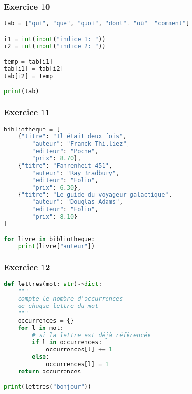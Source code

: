 \documentclass[svgnames,11pt]{beamer}
\begin{document}
\begin{frame}[fragile]
    \frametitle{Exercice 10}

\begin{exo}
\begin{lstlisting}[language=Python,basicstyle=\ttfamily\small  , xleftmargin=2em, xrightmargin=2em]
tab = ["qui", "que", "quoi", "dont", "où", "comment"]

i1 = int(input("indice 1: "))
i2 = int(input("indice 2: "))

temp = tab[i1]
tab[i1] = tab[i2]
tab[i2] = temp

print(tab)
\end{lstlisting}
\end{exo}    

\end{frame}

\begin{frame}[fragile]
    \frametitle{Exercice 11}

\begin{exo}
\begin{lstlisting}[language=Python,basicstyle=\ttfamily\small  , xleftmargin=2em, xrightmargin=2em]
bibliotheque = [
    {"titre": "Il était deux fois", 
        "auteur": "Franck Thilliez",
        "editeur": "Poche",
        "prix": 8.70},
    {"titre": "Fahrenheit 451", 
        "auteur": "Ray Bradbury",
        "editeur": "Folio",
        "prix": 6.30},
    {"titre": "Le guide du voyageur galactique", 
        "auteur": "Douglas Adams",
        "editeur": "Folio",
        "prix": 8.10}
]

for livre in bibliotheque:
    print(livre["auteur"])
\end{lstlisting}
\end{exo}    

\end{frame}
\begin{frame}[fragile]
    \frametitle{Exercice 12}

\begin{exo}
\begin{lstlisting}[language=Python,basicstyle=\ttfamily\small , xleftmargin=2em, xrightmargin=2em]
def lettres(mot: str)->dict:
    """
    compte le nombre d'occurrences
    de chaque lettre du mot
    """
    occurrences = {}
    for l in mot:
        # si la lettre est déjà référencée
        if l in occurrences:
            occurrences[l] += 1
        else:
            occurrences[l] = 1
    return occurrences

print(lettres("bonjour"))
\end{lstlisting}
\end{exo}    

\end{frame}
\end{document}
